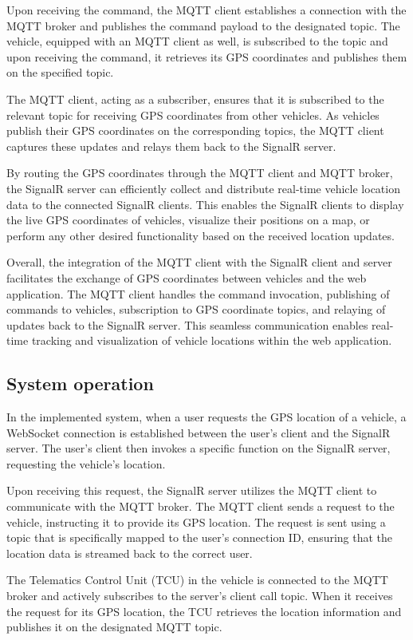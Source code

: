 \documentclass[
12pt,
oneside, 
onehalfspacing, 
nolistspacing, 
parskip, 
chapterinoneline, 
]{AASTCOMPUTER}
\begin{document}
Upon receiving the command, the MQTT client establishes a connection with the MQTT broker and publishes the command payload to the designated topic. The vehicle, equipped with an MQTT client as well, is subscribed to the topic and upon receiving the command, it retrieves its GPS coordinates and publishes them on the specified topic.

The MQTT client, acting as a subscriber, ensures that it is subscribed to the relevant topic for receiving GPS coordinates from other vehicles. As vehicles publish their GPS coordinates on the corresponding topics, the MQTT client captures these updates and relays them back to the SignalR server.

By routing the GPS coordinates through the MQTT client and MQTT broker, the SignalR server can efficiently collect and distribute real-time vehicle location data to the connected SignalR clients. This enables the SignalR clients to display the live GPS coordinates of vehicles, visualize their positions on a map, or perform any other desired functionality based on the received location updates.

Overall, the integration of the MQTT client with the SignalR client and server facilitates the exchange of GPS coordinates between vehicles and the web application. The MQTT client handles the command invocation, publishing of commands to vehicles, subscription to GPS coordinate topics, and relaying of updates back to the SignalR server. This seamless communication enables real-time tracking and visualization of vehicle locations within the web application.

\subsection{System operation}
In the implemented system, when a user requests the GPS location of a vehicle, a WebSocket connection is established between the user's client and the SignalR server. The user's client then invokes a specific function on the SignalR server, requesting the vehicle's location. 

Upon receiving this request, the SignalR server utilizes the MQTT client to communicate with the MQTT broker. The MQTT client sends a request to the vehicle, instructing it to provide its GPS location. The request is sent using a topic that is specifically mapped to the user's connection ID, ensuring that the location data is streamed back to the correct user.

The Telematics Control Unit (TCU) in the vehicle is connected to the MQTT broker and actively subscribes to the server's client call topic. When it receives the request for its GPS location, the TCU retrieves the location information and publishes it on the designated MQTT topic.
\end{document}
